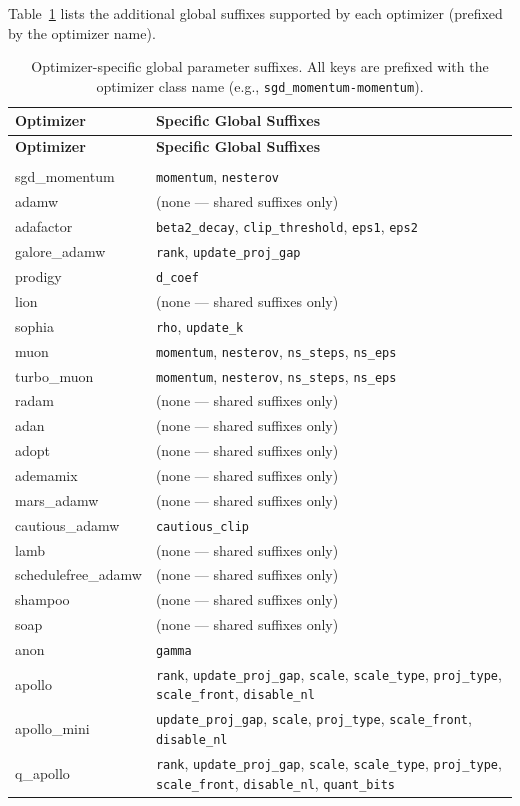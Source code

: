 Table~\ref{tab:optimizer-specific-suffixes} lists the additional global suffixes supported by each optimizer (prefixed by the optimizer name).

\begin{longtable}{>{\ttfamily}l>{\raggedright\arraybackslash}p{10cm}}
\toprule
\textbf{Optimizer} & \textbf{Specific Global Suffixes} \\
\midrule
\endfirsthead
\toprule
\textbf{Optimizer} & \textbf{Specific Global Suffixes} \\
\midrule
\endhead
\midrule
\multicolumn{2}{r}{\textit{continued on next page}} \\
\endfoot
\bottomrule
\caption{Optimizer-specific global parameter suffixes. All keys are prefixed with the optimizer class name (e.g., \texttt{sgd\_momentum-momentum}).}
\label{tab:optimizer-specific-suffixes}
\endlastfoot
sgd\_momentum & \texttt{momentum}, \texttt{nesterov} \\
adamw & (none --- shared suffixes only) \\
adafactor & \texttt{beta2\_decay}, \texttt{clip\_threshold}, \texttt{eps1}, \texttt{eps2} \\
galore\_adamw & \texttt{rank}, \texttt{update\_proj\_gap} \\
prodigy & \texttt{d\_coef} \\
lion & (none --- shared suffixes only) \\
sophia & \texttt{rho}, \texttt{update\_k} \\
muon & \texttt{momentum}, \texttt{nesterov}, \texttt{ns\_steps}, \texttt{ns\_eps} \\
turbo\_muon & \texttt{momentum}, \texttt{nesterov}, \texttt{ns\_steps}, \texttt{ns\_eps} \\
radam & (none --- shared suffixes only) \\
adan & (none --- shared suffixes only) \\
adopt & (none --- shared suffixes only) \\
ademamix & (none --- shared suffixes only) \\
mars\_adamw & (none --- shared suffixes only) \\
cautious\_adamw & \texttt{cautious\_clip} \\
lamb & (none --- shared suffixes only) \\
schedulefree\_adamw & (none --- shared suffixes only) \\
shampoo & (none --- shared suffixes only) \\
soap & (none --- shared suffixes only) \\
anon & \texttt{gamma} \\
apollo & \texttt{rank}, \texttt{update\_proj\_gap}, \texttt{scale}, \texttt{scale\_type}, \texttt{proj\_type}, \texttt{scale\_front}, \texttt{disable\_nl} \\
apollo\_mini & \texttt{update\_proj\_gap}, \texttt{scale}, \texttt{proj\_type}, \texttt{scale\_front}, \texttt{disable\_nl} \\
q\_apollo & \texttt{rank}, \texttt{update\_proj\_gap}, \texttt{scale}, \texttt{scale\_type}, \texttt{proj\_type}, \texttt{scale\_front}, \texttt{disable\_nl}, \texttt{quant\_bits} \\
\end{longtable}

